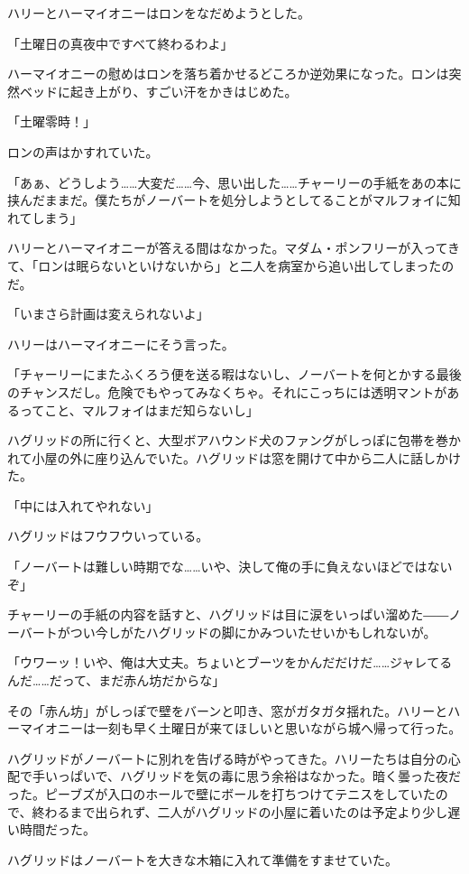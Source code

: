 \documentclass[10pt,a4paper]{article}
\begin{document}
\begin{CJK}{UTF8}{min}
ハリーとハーマイオニーはロンをなだめようとした。

「土曜日の真夜中ですべて終わるわよ」

ハーマイオニーの慰めはロンを落ち着かせるどころか逆効果になった。ロンは突然ベッドに起き上がり、すごい汗をかきはじめた。

「土曜零時！」

ロンの声はかすれていた。

「あぁ、どうしよう……大変だ……今、思い出した……チャーリーの手紙をあの本に挟んだままだ。僕たちがノーバートを処分しようとしてることがマルフォイに知れてしまう」

ハリーとハーマイオニーが答える間はなかった。マダム・ポンフリーが入ってきて、「ロンは眠らないといけないから」と二人を病室から追い出してしまったのだ。



「いまさら計画は変えられないよ」

ハリーはハーマイオニーにそう言った。

「チャーリーにまたふくろう便を送る暇はないし、ノーバートを何とかする最後のチャンスだし。危険でもやってみなくちゃ。それにこっちには透明マントがあるってこと、マルフォイはまだ知らないし」

ハグリッドの所に行くと、大型ボアハウンド犬のファングがしっぽに包帯を巻かれて小屋の外に座り込んでいた。ハグリッドは窓を開けて中から二人に話しかけた。

「中には入れてやれない」

ハグリッドはフウフウいっている。

「ノーバートは難しい時期でな……いや、決して俺の手に負えないほどではないぞ」

チャーリーの手紙の内容を話すと、ハグリッドは目に涙をいっぱい溜めた――ノーバートがつい今しがたハグリッドの脚にかみついたせいかもしれないが。

「ウワーッ！いや、俺は大丈夫。ちょいとブーツをかんだだけだ……ジャレてるんだ……だって、まだ赤ん坊だからな」

その「赤ん坊」がしっぽで壁をバーンと叩き、窓がガタガタ揺れた。ハリーとハーマイオニーは一刻も早く土曜日が来てほしいと思いながら城へ帰って行った。



ハグリッドがノーバートに別れを告げる時がやってきた。ハリーたちは自分の心配で手いっぱいで、ハグリッドを気の毒に思う余裕はなかった。暗く曇った夜だった。ピーブズが入口のホールで壁にボールを打ちつけてテニスをしていたので、終わるまで出られず、二人がハグリッドの小屋に着いたのは予定より少し遅い時間だった。

ハグリッドはノーバートを大きな木箱に入れて準備をすませていた。


\end{CJK}
\end{document}
